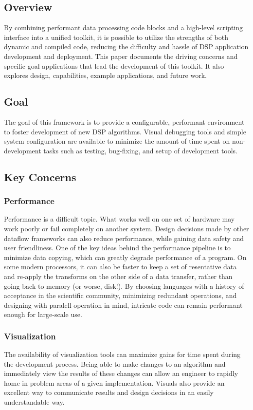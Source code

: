 \documentclass[journal]{IEEEtran}
\begin{document}
\subsection{Overview}
By combining performant data processing code blocks and a high-level scripting interface into a unified toolkit, it 
is possible to utilize the strengths of both dynamic and compiled code, reducing the difficulty and hassle of DSP application 
development and deployment. This paper documents the driving concerns and specific goal applications that lead the development of this toolkit. 
It also explores design, capabilities, example applications, and future work. 

\subsection{Goal}
The goal of this framework is to provide a configurable, performant environment to foster development of new DSP algorithms. 
Visual debugging tools and simple system configuration are available to minimize the amount of time spent on non-development tasks
such as testing, bug-fixing, and setup of development tools.   

\subsection{Key Concerns}
\subsubsection{Performance}
Performance is a difficult topic. What works well on one set of hardware may work poorly or fail completely on another system. Design decisions
made by other dataflow frameworks can also reduce performance, while gaining data safety and user friendliness. One of the key ideas behind the 
performance pipeline is to minimize data copying, which can greatly degrade performance of a program. On some modern processors, it can also be 
faster to keep a set of resentative data and re-apply the transforms on the other side of a data transfer, rather than going back to memory 
(or worse, disk!). By choosing languages with a history of acceptance in the scientific community, minimizing redundant operations, and designing 
with paralell operation in mind, intricate code can remain performant enough for large-scale use.

\subsubsection{Visualization}
The availability of visualization tools can maximize gains for time spent during the development process. Being able to make changes to an 
algorithm and immediately view the results of these changes can allow an engineer to rapidly home in problem areas of a given implementation. 
Visuals also provide an excellent way to communicate results and design decisions in an easily understandable way.
\end{document}
